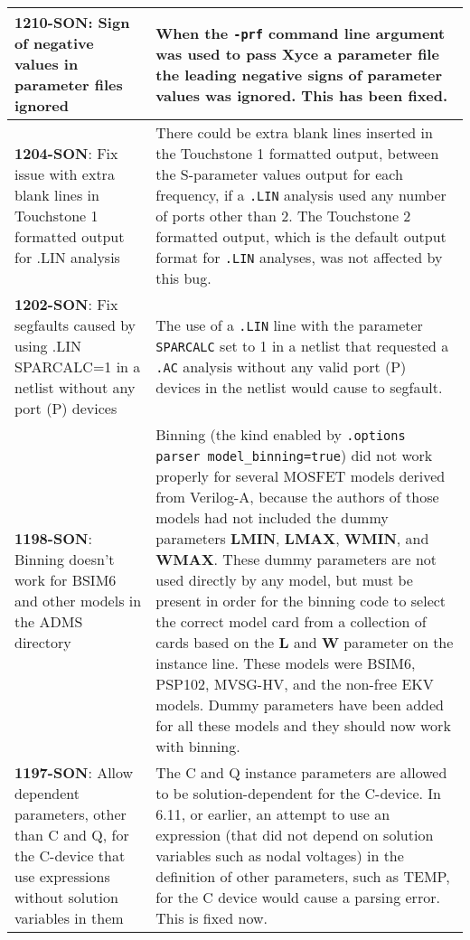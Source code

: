 {\begin{longtable}[h] {>{\raggedright\small}m{2in}|>{\raggedright\let\\\tabularnewline\small}m{3.5in}}
\textbf{1210-SON}: Sign of negative values in parameter files ignored &
When the \texttt{-prf} command line argument was used to pass Xyce a
parameter file the leading negative signs of parameter values was
ignored.  This has been fixed.  \\ \hline

\textbf{1204-SON}: Fix issue with extra blank lines in Touchstone 1 formatted output
for .LIN analysis &

There could be extra blank lines inserted in the Touchstone 1
formatted output, between the S-parameter values output for each
frequency, if a
\texttt{.LIN} analysis used any number of ports other than 2.  The Touchstone 2
formatted output, which is the default output format for \texttt{.LIN} analyses,
was not affected by this bug. \\ \hline

\textbf{1202-SON}: Fix segfaults caused by using .LIN SPARCALC=1 in a netlist
without any port (P) devices & The use of a \texttt{.LIN} line with the
parameter \texttt{SPARCALC} set to 1 in a netlist that requested a \texttt{.AC}
analysis without any valid port (P) devices in the netlist would cause
\Xyce{} to segfault. \\ \hline

\textbf{1198-SON}: Binning doesn't work for BSIM6 and other models in the ADMS directory &
Binning (the kind enabled by \texttt{.options parser
model\_binning=true}) did not work properly for several MOSFET models
derived from Verilog-A, because the authors of those models had not
included the dummy
parameters \textbf{LMIN}, \textbf{LMAX}, \textbf{WMIN},
and \textbf{WMAX}.  These dummy parameters are not used directly by
any model, but must be present in order for the binning code to select
the correct model card from a collection of cards based on
the \textbf{L} and \textbf{W} parameter on the instance line.  These
models were BSIM6, PSP102, MVSG-HV, and the non-free EKV models.
Dummy parameters have been added for all these models and they should
now work with binning. \\ \hline

\textbf{1197-SON}: Allow dependent parameters, other than C and Q, for
the C-device that use expressions without solution variables in them &
The C and Q instance parameters are allowed to be solution-dependent
for the C-device.  In \Xyce{} 6.11, or earlier, an attempt to use an
expression (that did not depend on solution variables such as nodal voltages)
in the definition of other parameters, such as TEMP, for the C device
would cause a parsing error.  This is fixed now.
\\ \hline


\end{longtable}}
